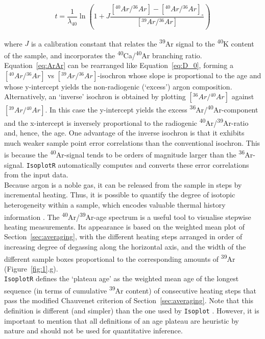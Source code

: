 \documentclass{article}
\begin{document}
\begin{equation}
  t = \frac{1}{\lambda_{40}} \ln\left( 1 + J
  \frac{[{}^{40}Ar/{}^{36}Ar] -
        [{}^{40}Ar/{}^{36}Ar]_\circ}{
        [{}^{39}Ar/{}^{36}Ar]} \right)
\label{eq:ArAr}
\end{equation}

\noindent where $J$ is a calibration constant that relates the
\textsuperscript{39}Ar signal to the \textsuperscript{40}K content of
the sample, and incorporates the
\textsuperscript{40}Ca/\textsuperscript{40}Ar branching
ratio. Equation~\ref{eq:ArAr} can be rearranged like
Equation~\ref{eq:D_0}, forming a $[{}^{40}Ar/{}^{36}Ar]$ vs
$[{}^{39}Ar/{}^{36}Ar]$-isochron whose slope is proportional to the
age and whose y-intercept yields the non-radiogenic (`excess') argon
composition.\\

Alternatively, an `inverse' isochron is obtained by plotting
$[{}^{36}Ar/{}^{40}Ar]$ against $[{}^{39}Ar/{}^{40}Ar]$. In this case
the y-intercept yields the excess
\textsuperscript{36}Ar/\textsuperscript{40}Ar-component and the
x-intercept is inversely proportional to the radiogenic
\textsuperscript{40}Ar/\textsuperscript{39}Ar-ratio and, hence, the
age. One advantage of the inverse isochron is that it exhibits much
weaker sample point error correlations than the conventional
isochron. This is because the \textsuperscript{40}Ar-signal tends to
be orders of magnitude larger than the
\textsuperscript{36}Ar-signal. \texttt{IsoplotR} automatically
computes and converts these error correlations from the input data.\\

Because argon is a noble gas, it can be released from the sample in
steps by incremental heating. Thus, it is possible to quantify the
degree of isotopic heterogeneity within a sample, which encodes
valuable thermal history information \citep{mcdougall1999}. The
\textsuperscript{40}Ar/\textsuperscript{39}Ar-age spectrum is a useful
tool to visualise stepwise heating measurements. Its appearance is
based on the weighted mean plot of Section~\ref{sec:averaging}, with
the different heating steps arranged in order of increasing degree of
degassing along the horizontal axis, and the width of the different
sample boxes proportional to the corresponding amounts of
\textsuperscript{39}Ar (Figure~\ref{fig:1}.g).\\

\texttt{IsoplotR} defines the `plateau age' as the weighted mean age
of the longest sequence (in terms of cumulative \textsuperscript{39}Ar
content) of consecutive heating steps that pass the modified Chauvenet
criterion of Section~\ref{sec:averaging}.  Note that this definition
is different (and simpler) than the one used by \texttt{Isoplot}
\citep{ludwig2003}. However, it is important to mention that all
definitions of an age plateau are heuristic by nature and should not
be used for quantitative inference.
\end{document}
